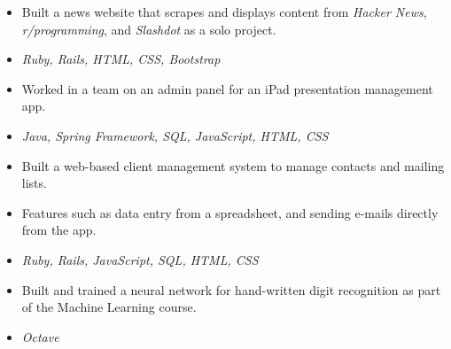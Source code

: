 


\begin{itemize}
	\item Built a news website that scrapes and displays content from \textit{Hacker News}, \textit{r/programming}, and \textit{Slashdot} as a solo project.
	\item \textit{Ruby, Rails, HTML, CSS, Bootstrap}
\end{itemize}

\begin{itemize}
    \item Worked in a team on an admin panel for an iPad presentation management app.
    \item \textit{Java, Spring Framework, SQL, JavaScript, HTML, CSS}
\end{itemize}

\begin{itemize}
    \item Built a web-based client management system to manage contacts and mailing lists.
    \item Features such as data entry from a spreadsheet, and sending e-mails directly from the app. 
    \item \textit{Ruby, Rails, JavaScript, SQL, HTML, CSS}
\end{itemize}

\begin{itemize}
    \item Built and trained a neural network for hand-written digit recognition as part of the Machine Learning course.
    \item \textit{Octave}
\end{itemize}


\divider

\divider

    

